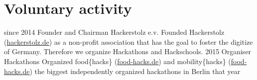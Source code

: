 \documentclass[a4paper]{friggeri-cv}
\begin{document}
\section{Voluntary activity}
\begin{entrylist}
	\entry
	 {since 2014}
    {Founder and Chairman}
    {Hackerstolz e.v.}
    {Founded Hackerstolz (\href{http://hackerstolz.de}{hackerstolz.de}) as a non-profit association that has the goal to foster the digitize of Germany. Therefore we organize Hackathons and Hackschools.}
	\entry
	 {2015}
    {Organiser}
    {Hackathons}
    {Organized food\{hacks\} (\href{http://food-hacks.de}{food-hacks.de}) and mobility\{hacks\} (\href{http://mobility-hacks.de}{food-hacks.de}) the biggest independently organized hackathons in Berlin that year}
\end{entrylist}
\end{document}
